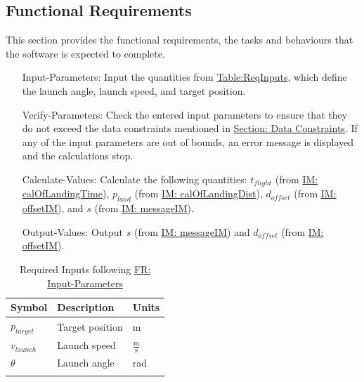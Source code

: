 \documentclass[12pt]{article}
\begin{document}
\subsection{Functional Requirements}
\label{Sec:FRs}
This section provides the functional requirements, the tasks and behaviours that the software is expected to complete.
\begin{itemize}
\item[Input-Parameters:\phantomsection\label{inputParams}]Input the quantities from \hyperref[Table:ReqInputs]{Table:ReqInputs}, which define the launch angle, launch speed, and target position.
\item[Verify-Parameters:\phantomsection\label{verifyParams}]Check the entered input parameters to ensure that they do not exceed the data constraints mentioned in \hyperref[Sec:DataConstraints]{Section: Data Constraints}. If any of the input parameters are out of bounds, an error message is displayed and the calculations stop.
\item[Calculate-Values:\phantomsection\label{calcValues}]Calculate the following quantities: ${t_{flight}}$ (from \hyperref[IM:calOfLandingTime]{IM: calOfLandingTime}), ${p_{land}}$ (from \hyperref[IM:calOfLandingDist]{IM: calOfLandingDist}), ${d_{offset}}$ (from \hyperref[IM:offsetIM]{IM: offsetIM}), and $s$ (from \hyperref[IM:messageIM]{IM: messageIM}).
\item[Output-Values:\phantomsection\label{outputValues}]Output $s$ (from \hyperref[IM:messageIM]{IM: messageIM}) and ${d_{offset}}$ (from \hyperref[IM:offsetIM]{IM: offsetIM}).
\end{itemize}
\begin{longtable}{l l l}
\toprule
Symbol & Description & Units
\\
\midrule
\endhead
${p_{target}}$ & Target position & m
\\
${v_{launch}}$ & Launch speed & $\frac{\text{m}}{\text{s}}$
\\
$θ$ & Launch angle & rad
\\
\bottomrule
\caption{Required Inputs following \hyperref[inputParams]{FR: Input-Parameters}}
\label{Table:ReqInputs}
\end{longtable}
\end{document}
